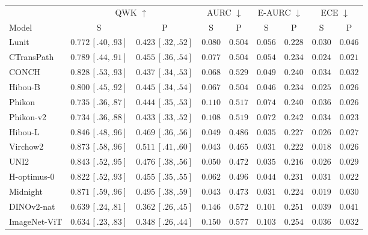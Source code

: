 \begin{tabular}{lcccccccc}
\toprule
& \multicolumn{2}{c}{QWK $\uparrow$} & \multicolumn{2}{c}{AURC $\downarrow$}
& \multicolumn{2}{c}{E-AURC $\downarrow$} & \multicolumn{2}{c}{ECE $\downarrow$} \\
\cmidrule(lr){2-3}\cmidrule(lr){4-5}\cmidrule(lr){6-7}\cmidrule(lr){8-9}
Model & S & P & S & P & S & P & S & P \\
\midrule
Lunit & $0.772\,[.40,.93]$ & $0.423\,[.32,.52]$ & $0.080$ & $0.504$ & $0.056$ & $0.228$ & $0.030$ & $0.046$ \\
CTransPath & $0.789\,[.44,.91]$ & $0.455\,[.36,.54]$ & $0.077$ & $0.504$ & $0.054$ & $0.234$ & $0.024$ & $0.021$ \\
CONCH & $0.828\,[.53,.93]$ & $0.437\,[.34,.53]$ & $0.068$ & $0.529$ & $0.049$ & $0.240$ & $0.034$ & $0.032$ \\
Hibou-B & $0.800\,[.45,.92]$ & $0.445\,[.34,.54]$ & $0.067$ & $0.504$ & $0.046$ & $0.234$ & $0.025$ & $0.026$ \\
Phikon & $0.735\,[.36,.87]$ & $0.444\,[.35,.53]$ & $0.110$ & $0.517$ & $0.074$ & $0.240$ & $0.036$ & $0.026$ \\
Phikon-v2 & $0.734\,[.36,.88]$ & $0.433\,[.33,.52]$ & $0.108$ & $0.519$ & $0.072$ & $0.242$ & $0.034$ & $0.023$ \\
Hibou-L & $0.846\,[.48,.96]$ & $0.469\,[.36,.56]$ & $0.049$ & $0.486$ & $0.035$ & $0.227$ & $0.026$ & $0.027$ \\
Virchow2 & $0.873\,[.58,.96]$ & $0.511\,[.41,.60]$ & $0.043$ & $0.465$ & $0.031$ & $0.222$ & $0.018$ & $0.026$ \\
UNI2 & $0.843\,[.52,.95]$ & $0.476\,[.38,.56]$ & $0.050$ & $0.472$ & $0.035$ & $0.216$ & $0.026$ & $0.029$ \\
H-optimus-0 & $0.822\,[.52,.93]$ & $0.455\,[.35,.55]$ & $0.062$ & $0.496$ & $0.044$ & $0.231$ & $0.031$ & $0.022$ \\
Midnight & $0.871\,[.59,.96]$ & $0.495\,[.38,.59]$ & $0.043$ & $0.473$ & $0.031$ & $0.224$ & $0.019$ & $0.030$ \\
\midrule
DINOv2-nat & $0.639\,[.24,.81]$ & $0.362\,[.26,.45]$ & $0.146$ & $0.572$ & $0.101$ & $0.251$ & $0.039$ & $0.041$ \\
ImageNet-ViT & $0.634\,[.23,.83]$ & $0.348\,[.26,.44]$ & $0.150$ & $0.577$ & $0.103$ & $0.254$ & $0.036$ & $0.032$ \\
\bottomrule
\end{tabular}
